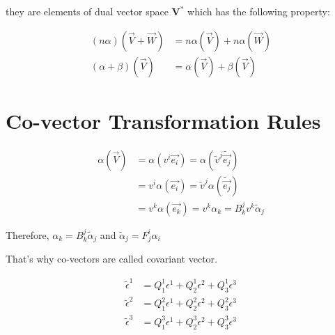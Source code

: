 \documentclass{article}
\begin{document}
	they are elements of dual vector space $\mathbf{V}^{*}$ which has the following property:
	
	\begin{tcolorbox}
		\begin{center}
			\begin{equation}
				\begin{aligned}
					(n\alpha)(\overrightarrow{V}+\overrightarrow{W}) &= n\alpha(\overrightarrow{V}) + n\alpha(\overrightarrow{W})\\
					(\alpha + \beta)(\overrightarrow{V}) &= \alpha(\overrightarrow{V}) + \beta(\overrightarrow{V})
				\end{aligned}\label{eq4}
			\end{equation} 
		\end{center}
	\end{tcolorbox}	

	\section*{Co-vector Transformation Rules}
	
	\begin{align*}
		\alpha(\overrightarrow{V}) &= \alpha(v^{i}\overrightarrow{e_{i}}) = \alpha(\widetilde{v}^{j}\widetilde{\overrightarrow{e_{j}}})\\
								   &= v^{i}\alpha(\overrightarrow{e_{i}}) = \widetilde{v}^{j}\alpha(\widetilde{\overrightarrow{e_{j}}})\\
								   &= v^{k}\alpha(\overrightarrow{e_{k}}) = v^{k}\alpha_{k} = B^{j}_{k}v^{k}\widetilde{\alpha}_{j}
	\end{align*}

	Therefore, $\alpha_{k} = B^{j}_{k}\widetilde{\alpha}_{j}$ and $\widetilde{\alpha}_{j} = F_{j}^{i}\alpha_{i}$ 
	
	That’s why co-vectors are called covariant vector.
	
	
	
	\begin{center}
		\begin{align*}
			\widetilde{\epsilon}^{1} &= Q^{1}_{1}\epsilon^{1} + Q^{1}_{2}\epsilon^{2} + Q^{1}_{3}\epsilon^{3}\\
			\widetilde{\epsilon}^{2} &= Q^{2}_{1}\epsilon^{1} + Q^{2}_{2}\epsilon^{2} + Q^{2}_{3}\epsilon^{3}\\
			\widetilde{\epsilon}^{3} &= Q^{3}_{1}\epsilon^{1} + Q^{3}_{2}\epsilon^{2} + Q^{3}_{3}\epsilon^{3}
		\end{align*}
	\end{center}
\end{document}
